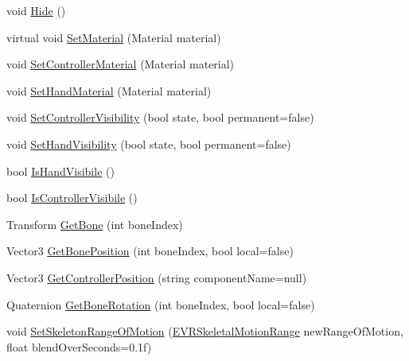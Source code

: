 \begin{DoxyCompactItemize}
void \mbox{\hyperlink{class_valve_1_1_v_r_1_1_interaction_system_1_1_render_model_a090968700e04c79f78aab583551e3d83}{Hide}} ()
\item 
virtual void \mbox{\hyperlink{class_valve_1_1_v_r_1_1_interaction_system_1_1_render_model_a5248fda9972c21a590dc69126ad43116}{Set\+Material}} (Material material)
\item 
void \mbox{\hyperlink{class_valve_1_1_v_r_1_1_interaction_system_1_1_render_model_a8a884caebc7343db0678ceeb326f8abc}{Set\+Controller\+Material}} (Material material)
\item 
void \mbox{\hyperlink{class_valve_1_1_v_r_1_1_interaction_system_1_1_render_model_a0163b9461e5d88248043f57085fc6ae6}{Set\+Hand\+Material}} (Material material)
\item 
void \mbox{\hyperlink{class_valve_1_1_v_r_1_1_interaction_system_1_1_render_model_a4d38ada2d39298a1befdef64bbff514a}{Set\+Controller\+Visibility}} (bool state, bool permanent=false)
\item 
void \mbox{\hyperlink{class_valve_1_1_v_r_1_1_interaction_system_1_1_render_model_ae789148be24fed07f8b843a7aeb6c495}{Set\+Hand\+Visibility}} (bool state, bool permanent=false)
\item 
bool \mbox{\hyperlink{class_valve_1_1_v_r_1_1_interaction_system_1_1_render_model_a95e4574958085d66d05d079cc3ef50d3}{Is\+Hand\+Visibile}} ()
\item 
bool \mbox{\hyperlink{class_valve_1_1_v_r_1_1_interaction_system_1_1_render_model_a2ccf362841c0e73865d2473b4dafac0e}{Is\+Controller\+Visibile}} ()
\item 
Transform \mbox{\hyperlink{class_valve_1_1_v_r_1_1_interaction_system_1_1_render_model_a011fa7ffa9fc9a44ec1f4475bf672a45}{Get\+Bone}} (int bone\+Index)
\item 
Vector3 \mbox{\hyperlink{class_valve_1_1_v_r_1_1_interaction_system_1_1_render_model_a1856ea5197dfaef5ff050470b982e307}{Get\+Bone\+Position}} (int bone\+Index, bool local=false)
\item 
Vector3 \mbox{\hyperlink{class_valve_1_1_v_r_1_1_interaction_system_1_1_render_model_a304ff9471420fda69c51fd10184ae9dd}{Get\+Controller\+Position}} (string component\+Name=null)
\item 
Quaternion \mbox{\hyperlink{class_valve_1_1_v_r_1_1_interaction_system_1_1_render_model_ad2a03fc8955758e248e85e8a920a80d0}{Get\+Bone\+Rotation}} (int bone\+Index, bool local=false)
\item 
void \mbox{\hyperlink{class_valve_1_1_v_r_1_1_interaction_system_1_1_render_model_a78445f0b246f8ef9d0303cc0c2db102c}{Set\+Skeleton\+Range\+Of\+Motion}} (\mbox{\hyperlink{namespace_valve_1_1_v_r_affc8d18345f8f5d36f1ae7b4ce534500}{E\+V\+R\+Skeletal\+Motion\+Range}} new\+Range\+Of\+Motion, float blend\+Over\+Seconds=0.\+1f)

\end{DoxyCompactItemize}
